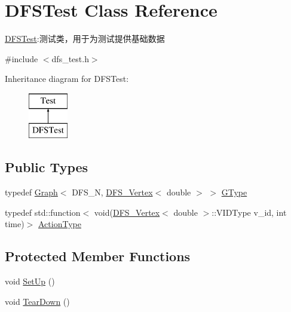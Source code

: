\hypertarget{class_d_f_s_test}{}\section{D\+F\+S\+Test Class Reference}
\label{class_d_f_s_test}


\hyperlink{class_d_f_s_test}{D\+F\+S\+Test}\+:测试类，用于为测试提供基础数据  




{\ttfamily \#include $<$dfs\+\_\+test.\+h$>$}

Inheritance diagram for D\+F\+S\+Test\+:\begin{figure}[H]
\begin{center}
\leavevmode
\includegraphics[height=2.000000cm]{class_d_f_s_test}
\end{center}
\end{figure}
\subsection*{Public Types}
\begin{DoxyCompactItemize}
\item 
typedef \hyperlink{struct_introduction_to_algorithm_1_1_graph_algorithm_1_1_graph}{Graph}$<$ D\+F\+S\+\_\+\+N, \hyperlink{struct_introduction_to_algorithm_1_1_graph_algorithm_1_1_d_f_s___vertex}{D\+F\+S\+\_\+\+Vertex}$<$ double $>$ $>$ \hyperlink{class_d_f_s_test_a32b63a9c79f6f7e7021daacf076a1512}{G\+Type}
\item 
typedef std\+::function$<$ void(\hyperlink{struct_introduction_to_algorithm_1_1_graph_algorithm_1_1_d_f_s___vertex}{D\+F\+S\+\_\+\+Vertex}$<$ double $>$\+::V\+I\+D\+Type v\+\_\+id, int time)$>$ \hyperlink{class_d_f_s_test_ac4c131b9b4f9de55192b1c634dc1c37f}{Action\+Type}
\end{DoxyCompactItemize}
\subsection*{Protected Member Functions}
\begin{DoxyCompactItemize}
\item 
void \hyperlink{class_d_f_s_test_aa8af56e0d079eb7c2b0ba7b6535d7d61}{Set\+Up} ()
\item 
void \hyperlink{class_d_f_s_test_afbe32ab6557cbca62368b480e1df593a}{Tear\+Down} ()
\end{DoxyCompactItemize}
